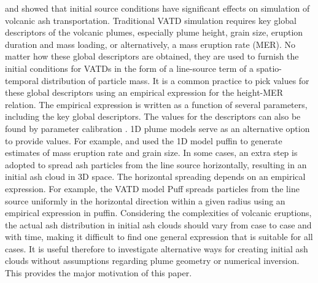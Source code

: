 \documentclass[draft,linenumbers]{agujournal2019}
\begin{document}
\citet{fero2009simulating} and \citet{stohl2011determination} showed that initial source conditions have significant effects on simulation of volcanic ash transportation.  Traditional VATD simulation requires key global descriptors of the volcanic plumes, especially plume height, grain size, eruption duration and mass loading, or alternatively, a mass eruption rate (MER). No matter how these global descriptors are obtained, they are used to furnish the initial conditions for VATDs in the form of a line-source term of a spatio-temporal distribution of particle mass. It is a common practice to pick values for these global descriptors using an empirical expression for the height-MER relation. The empirical expression is written as a function of several parameters, including the key global descriptors.  The values for the descriptors can also be found by parameter calibration \citep[e.g.][]{fero2008simulation,fero2009simulating, stohl2011determination, zidikheri2017estimation}. 1D plume models serve as an alternative option to provide values. For example, \citet{bursik2012estimation} and \citet{stefanescu2014temporal} used the 1D model puffin \citep{bursik2001effect} to generate estimates of mass eruption rate and grain size.  In some cases, an extra step is adopted to spread ash particles from the line source horizontally, resulting in an initial ash cloud in 3D space.  The horizontal spreading depends on an empirical expression. For example, the VATD model Puff spreads particles from the line source uniformly in the horizontal direction within a given radius using an empirical expression in puffin.  Considering the complexities of volcanic eruptions, the actual ash distribution in initial ash clouds should vary from case to case and with time, making it difficult to find one general expression that is suitable for all cases. It is useful therefore to investigate alternative ways for creating initial ash clouds without assumptions regarding plume geometry or numerical inversion. This provides the  major motivation of this paper.
\end{document}
